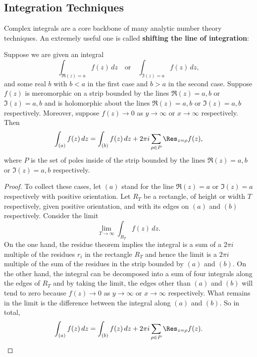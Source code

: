     \subsection*{Integration Techniques}
      Complex integrals are a core backbone of many analytic number theory techniques. An extremely useful one is called \textbf{shifting the line of integration}:

      \begin{theorem}
        Suppose we are given an integral
        \[
          \int_{\Re(z) = a}f(z)\,dz \quad \text{or} \quad \int_{\Im(z) = a}f(z)\,dz,
        \]
        and some real $b$ with $b < a$ in the first case and $b > a$ in the second case. Suppose $f(z)$ is meromorphic on a strip bounded by the lines $\Re(z) = a,b$ or $\Im(z) = a,b$ and is holomorphic about the lines $\Re(z) = a,b$ or $\Im(z) = a,b$ respectively. Moreover, suppose $f(z) \to 0$ as $y \to \infty$ or $x \to \infty$ respectively. Then
        \[
          \int_{(a)}f(z)\,dz = \int_{(b)}f(z)\,dz+2\pi i\sum_{\rho \in P}\Res_{z = \rho}f(z),
        \]
        where $P$ is the set of poles inside of the strip bounded by the lines $\Re(z) = a,b$ or $\Im(z) = a,b$ respectively.
      \end{theorem}
      \begin{proof}
        To collect these cases, let $(a)$ stand for the line $\Re(z) = a$ or $\Im(z) = a$ respectively with positive orientation. Let $R_{T}$ be a rectangle, of height or width $T$ respectively, given positive orientation, and with its edges on $(a)$ and $(b)$ respectively. Consider the limit
        \[
          \lim_{T \to \infty}\int_{R_{T}}f(z)\,dz.
        \]
        On the one hand, the residue theorem implies the integral is a sum of a $2\pi i$ multiple of the residues $r_{i}$ in the rectangle $R_{T}$ and hence the limit is a $2\pi i$ multiple of the sum of the residues in the strip bounded by $(a)$ and $(b)$. On the other hand, the integral can be decomposed into a sum of four integrals along the edges of $R_{T}$ and by taking the limit, the edges other than $(a)$ and $(b)$ will tend to zero because $f(z) \to 0$ as $y \to \infty$ or $x \to \infty$ respectively. What remains in the limit is the difference between the integral along $(a)$ and $(b)$. So in total,
        \[
          \int_{(a)}f(z)\,dz = \int_{(b)}f(z)\,dz+2\pi i\sum_{\rho \in P}\Res_{z = \rho}f(z).
        \]
      \end{proof}

